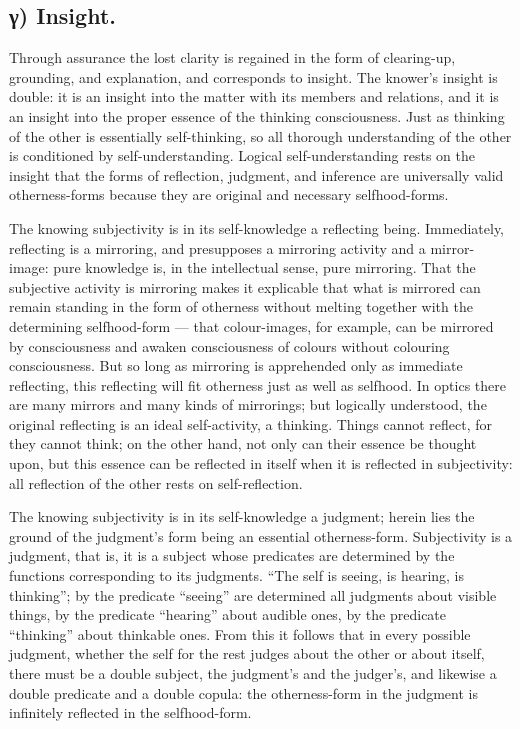 \documentclass[12pt]{book}
\begin{document}
\subsection*{γ) Insight.}

Through assurance the lost clarity is regained in the form of
clearing-up, grounding, and explanation, and corresponds to insight.
The knower's insight is double: it is an insight into the matter
with its members and relations, and it is an insight into the proper
essence of the thinking consciousness. Just as thinking of the other
is essentially self-thinking, so all thorough understanding of the
other is conditioned by self-understanding. Logical
self-understanding rests on the insight that the
forms of reflection, judgment, and inference are universally valid
otherness-forms because they are original and necessary
selfhood-forms.

The knowing subjectivity is in its self-knowledge a reflecting
being. Immediately, reflecting is a mirroring, and presupposes a
mirroring activity and a mirror-image: pure knowledge is, in the
intellectual sense, pure mirroring. That the subjective activity is
mirroring makes it explicable that what is mirrored can remain
standing in the form of otherness without melting together with the
determining selfhood-form --- that colour-images, for example, can
be mirrored by consciousness and awaken consciousness of colours
without colouring consciousness. But so long as mirroring is
apprehended only as immediate reflecting, this reflecting will fit
otherness just as well as selfhood. In optics there are many mirrors
and many kinds of mirrorings; but logically understood, the original
reflecting is an ideal self-activity, a thinking. Things cannot
reflect, for they cannot think; on the other hand, not only can
their essence be thought upon, but this essence can be reflected in
itself when it is reflected in subjectivity: all reflection of the
other rests on self-reflection.

The knowing subjectivity is in its self-knowledge a judgment; herein
lies the ground of the judgment's form being an essential
otherness-form. Subjectivity is a judgment, that is, it is a subject
whose predicates are determined by the functions corresponding to
its judgments. ``The self is seeing, is hearing, is thinking''; by
the predicate ``seeing'' are determined all judgments about visible
things, by the predicate ``hearing'' about audible ones, by the
predicate ``thinking'' about thinkable ones. From this it follows
that in every possible judgment, whether the self for the rest
judges about the other or about itself, there must be a double
subject, the judgment's and the judger's, and likewise a double
predicate and a double copula: the otherness-form in the judgment is
infinitely reflected in the selfhood-form.
\end{document}
